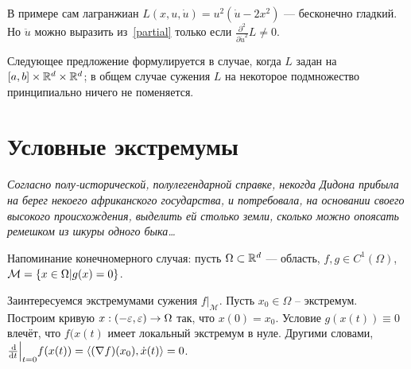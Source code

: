 \documentclass[a4paper]{article}
\begin{document}
    В примере сам лагранжиан $L(x, u, \dot{u}) = u^2(\dot{u} - 2x^2)$ --- бесконечно гладкий.
    Но $\ddot{u}$ можно выразить из~\eqref{partial} только если $\frac{\partial^2}{\partial \dot{u}^2}L \ne 0$.

    Следующее предложение формулируется в случае, когда $L$ задан на $[a, b] \times \mathbb{R}^d \times \mathbb{R}^d$; в общем случае сужения $L$ на некоторое подмножество принципиально ничего не поменяется.
    \section{Условные экстремумы}
    \emph{Согласно полу-исторической, полулегендарной справке, некогда Дидона прибыла на берег некоего африканского государства, и потребовала, на основании своего высокого происхождения, выделить ей столько земли, сколько можно опоясать ремешком из шкуры одного быка\ldots}

    Напоминание конечномерного случая:
    пусть $\Omega \subset \mathbb{R}^d$ --- область, $f, g \in C^1(\Omega)$, $\mathcal{M} = \left\{x \in \Omega\middle|g(x) = 0\right\}$.

    Заинтересуемся экстремумами сужения $f\big|_{\mathcal{M}}$.
    Пусть $x_0 \in \Omega$ -- экстремум.
    Построим кривую ${x:(-\varepsilon,\varepsilon)\rightarrow \Omega}$ так, что $x(0) = x_0$.
    Условие $g(x(t)) \equiv 0$ влечёт, что $f(x(t)$ имеет локальный экстремум в нуле.
    Другими словами, $\frac{\operatorname{d}\!}{\operatorname{d}\! t}\Big|_{t = 0}f(x(t)) = \left\langle(\nabla f)(x_0), \dot{x}(t)\right\rangle = 0$.
\end{document}
